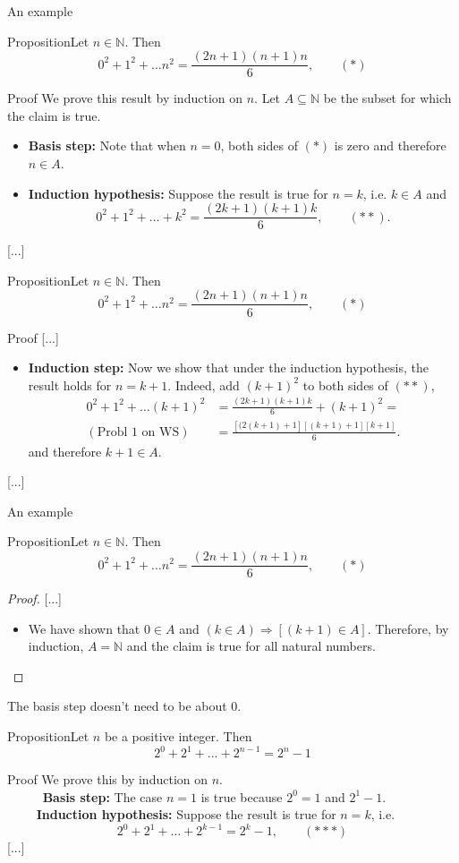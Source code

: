 \documentclass{beamer}
\def\bl[#1]#2{\begin{block}{#1}#2\end{block}}
\def\itemb{\begin{itemize}}
\def\iteme{\end{itemize}}
\begin{document}
\begin{frame}{An example}
\bl[Proposition]{Let $n\in\mathbb{N}$. Then
\[
0^2+1^2+\dots n^2=\frac{(2n+1)(n+1)n}{6},\qquad (*)
\]}

\bl[Proof]{
We prove this result by induction on $n$. Let $A\subseteq\mathbb{N}$ be the subset for which the claim is true.
\itemb
\item \textbf{Basis step:} Note that when $n=0$, both sides of $(*)$ is zero and therefore $n\in A$.
\item \textbf{Induction hypothesis:} Suppose the result is true for $n=k$, i.e. $k\in A$ and \vspace{-0.3cm}
\[
0^2+1^2+\dots+k^2=\frac{(2k+1)(k+1)k}{6},\qquad (**).
\]
\iteme\vspace{-0.5cm}
[...]
}
\end{frame}

\begin{frame}
\bl[Proposition]{Let $n\in\mathbb{N}$. Then\vspace{-0.3cm}
\[
0^2+1^2+\dots n^2=\frac{(2n+1)(n+1)n}{6},\qquad (*)
\]}

\bl[Proof]{
[...]\vspace{-0.2cm}
\itemb
\item \textbf{Induction step:} Now we show that under the induction hypothesis, the result holds for $n=k+1$. Indeed, add $(k+1)^2$ to both sides of $(**)$,
\begin{align*}
0^2+1^2+\dots (k+1)^2&=\frac{(2k+1)(k+1)k}{6}+(k+1)^2=\\
(\textrm{Probl 1 on WS})&=\frac{[(2(k+1)+1][(k+1)+1][k+1]}{6}.
\end{align*}
and therefore $k+1\in A$.
\iteme
[...]}
\end{frame}

\begin{frame}{An example}
\bl[Proposition]{Let $n\in\mathbb{N}$. Then
\[
0^2+1^2+\dots n^2=\frac{(2n+1)(n+1)n}{6},\qquad (*)
\]}
\begin{proof}

[...]
\itemb
\item We have shown that $0\in A$ and $(k\in A)\Rightarrow [(k+1)\in A]$. Therefore, by induction, $A=\mathbb{N}$ and the claim is true for all natural numbers.
\iteme
\end{proof}
\end{frame}

\begin{frame}{The basis step doesn't need to be about $0$.}

\bl[Proposition]{Let $n$ be a positive integer. Then
\[
2^0+2^1+\dots+2^{n-1}=2^n-1
\]}

\bl[Proof]{
We prove this by induction on $n$.\\\
~~~~ \textbf{Basis step:} The case $n=1$ is true because $2^0=1$ and $2^{1}-1$.\\
~~~~ \textbf{Induction hypothesis:} Suppose the result is true for $n=k$, i.e.
\[
2^0+2^1+\dots+2^{k-1}=2^k-1,\qquad (***)
\]
[...]
}
\end{frame}
\end{document}
